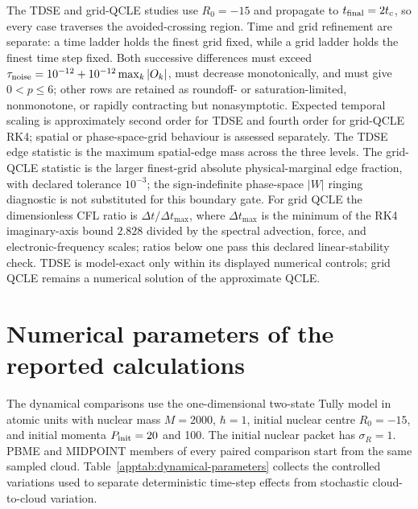 \documentclass[
  11pt,
  letterpaper,
  onehalfspacing,
  normalmargins,
  equalmargins,
  oneside
]{ut-thesis}
\begin{document}
The TDSE and grid-QCLE studies use \(R_0=-15\) and propagate to \(t_{\rm final}=2t_c\), so every case traverses the avoided-crossing region. Time and grid refinement are separate: a time ladder holds the finest grid fixed, while a grid ladder holds the finest time step fixed. Both successive differences must exceed \(\tau_{\rm noise}=10^{-12}+10^{-12}\max_k|O_k|\), must decrease monotonically, and must give \(0<p\leq6\); other rows are retained as roundoff- or saturation-limited, nonmonotone, or rapidly contracting but nonasymptotic. Expected temporal scaling is approximately second order for TDSE and fourth order for grid-QCLE RK4; spatial or phase-space-grid behaviour is assessed separately. The TDSE edge statistic is the maximum spatial-edge mass across the three levels. The grid-QCLE statistic is the larger finest-grid absolute physical-marginal edge fraction, with declared tolerance \(10^{-3}\); the sign-indefinite phase-space \(\lvert W\rvert\) ringing diagnostic is not substituted for this boundary gate. For grid QCLE the dimensionless CFL ratio is \(\Delta t/\Delta t_{\max}\), where \(\Delta t_{\max}\) is the minimum of the RK4 imaginary-axis bound \(2.828\) divided by the spectral advection, force, and electronic-frequency scales; ratios below one pass this declared linear-stability check. TDSE is model-exact only within its displayed numerical controls; grid QCLE remains a numerical solution of the approximate QCLE.


\section{Numerical parameters of the reported calculations}
\label{appsec:numerical-parameters}

The dynamical comparisons use the one-dimensional two-state Tully model in
atomic units with nuclear mass \(M=2000\), \(\hbar=1\), initial nuclear centre
\(R_0=-15\), and initial momenta \(P_{\rm init}=20\) and 100. The initial nuclear
packet has \(\sigma_R=1\). PBME and MIDPOINT members of every paired comparison
start from the same sampled cloud. Table~\ref{apptab:dynamical-parameters}
collects the controlled variations used to separate deterministic time-step
effects from stochastic cloud-to-cloud variation.
\end{document}
